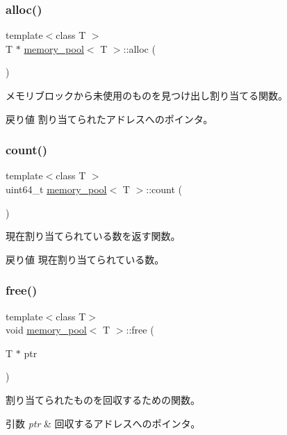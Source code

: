 \subsubsection{\texorpdfstring{alloc()}{alloc()}}
{\footnotesize\ttfamily template$<$class T $>$ \\
T $\ast$ \hyperlink{classmemory__pool}{memory\+\_\+pool}$<$ T $>$\+::alloc (\begin{DoxyParamCaption}{ }\end{DoxyParamCaption})}

メモリブロックから未使用のものを見つけ出し割り当てる関数。 \begin{DoxyReturn}{戻り値}
割り当てられたアドレスへのポインタ。 
\end{DoxyReturn}
\hypertarget{classmemory__pool_a601585beead8633f1253c976d75ce916}{}\label{classmemory__pool_a601585beead8633f1253c976d75ce916} 
\subsubsection{\texorpdfstring{count()}{count()}}
{\footnotesize\ttfamily template$<$class T $>$ \\
uint64\+\_\+t \hyperlink{classmemory__pool}{memory\+\_\+pool}$<$ T $>$\+::count (\begin{DoxyParamCaption}{ }\end{DoxyParamCaption})}

現在割り当てられている数を返す関数。 \begin{DoxyReturn}{戻り値}
現在割り当てられている数。 
\end{DoxyReturn}
\hypertarget{classmemory__pool_a18de6da11b20cc568984d3e9fa98015f}{}\label{classmemory__pool_a18de6da11b20cc568984d3e9fa98015f} 
\subsubsection{\texorpdfstring{free()}{free()}}
{\footnotesize\ttfamily template$<$class T$>$ \\
void \hyperlink{classmemory__pool}{memory\+\_\+pool}$<$ T $>$\+::free (\begin{DoxyParamCaption}\item[{T $\ast$}]{ptr }\end{DoxyParamCaption})}

割り当てられたものを回収するための関数。 
\begin{DoxyParams}{引数}
{\em ptr} & 回収するアドレスへのポインタ。 \\
\hline
\end{DoxyParams}
\hypertarget{classmemory__pool_a9ee94bfc4a06a78ed9b276c890b5d469}{}\label{classmemory__pool_a9ee94bfc4a06a78ed9b276c890b5d469} 
